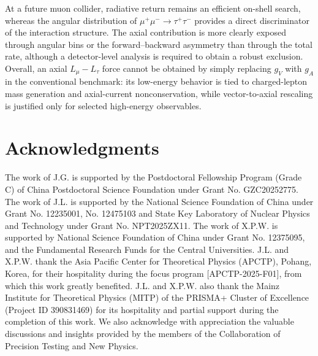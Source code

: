 \documentclass[onecolumn, aps, nofootinbib, prd, preprint, floats, floatfix, amsmath, amssymb, superscriptaddress, preprintnumbers]{revtex4-2}
\begin{document}
At a future muon collider, radiative return remains an efficient on-shell search, whereas the angular distribution of $\mu^+\mu^-\to\tau^+\tau^-$ provides a direct discriminator of the interaction structure. The axial contribution is more clearly exposed through angular bins or the forward--backward asymmetry than through the total rate, although a detector-level analysis is required to obtain a robust exclusion. Overall, an axial $L_\mu-L_\tau$ force cannot be obtained by simply replacing $g_V$ with $g_A$ in the conventional benchmark: its low-energy behavior is tied to charged-lepton mass generation and axial-current nonconservation, while vector-to-axial rescaling is justified only for selected high-energy observables.



\section{Acknowledgments}
The work of J.G. is supported by the Postdoctoral Fellowship Program (Grade C) of China Postdoctoral Science Foundation under Grant No. GZC20252775.
The work of J.L. is supported by the National Science Foundation of China under Grant No. 12235001, No. 12475103
and State Key Laboratory of Nuclear Physics and Technology under Grant No. NPT2025ZX11. 
The work of X.P.W. is supported by National Science Foundation of China under Grant No. 12375095, and the Fundamental Research Funds for the Central Universities.
J.L. and X.P.W. thank the Asia Pacific Center for Theoretical Physics (APCTP), Pohang, Korea, for their hospitality during the focus program [APCTP-2025-F01], from which this work greatly benefited. J.L. and X.P.W. also thank the Mainz Institute for Theoretical Physics (MITP) of the PRISMA+ Cluster of Excellence (Project ID 390831469) for its hospitality and partial support during the completion of this work. We also acknowledge with appreciation the valuable discussions and insights provided by the members of the Collaboration of Precision Testing and New Physics.



\end{document}
